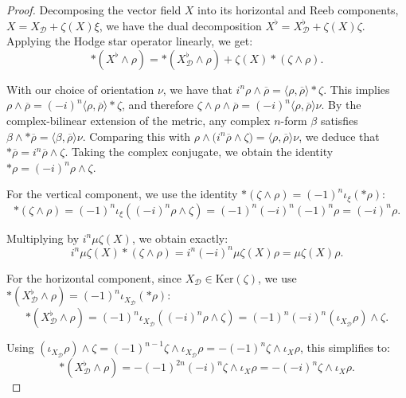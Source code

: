 \documentclass[10pt,a4paper,twoside,reqno]{amsart}
\theoremstyle{plain}
\theoremstyle{definition}
\theoremstyle{remark}
\newcommand{\escal}[1]{\langle#1\rangle}
\renewcommand{\ker}{\mathrm{Ker}}
\begin{document}
\begin{proof}
\noindent
Decomposing the vector field $X$ into its horizontal and Reeb components, $X = X_{\mathcal{D}} + \zeta(X)\xi$, we have the dual decomposition $X^{\flat} = X_{\mathcal{D}}^{\flat} + \zeta(X)\zeta$. Applying the Hodge star operator linearly, we get:
\begin{equation*}
*(X^{\flat} \wedge \rho) = *(X_{\mathcal{D}}^{\flat} \wedge \rho) + \zeta(X)*(\zeta \wedge \rho).
\end{equation*}

\noindent
With our choice of orientation $\nu$, we have that $i^n\rho\wedge\overline{\rho} = \escal{\rho,\overline{\rho}}*\zeta$. This implies $\rho \wedge \overline{\rho} = (-i)^n \escal{\rho,\overline{\rho}} *\zeta$, and therefore $\zeta \wedge \rho \wedge \overline{\rho} = (-i)^n \escal{\rho,\overline{\rho}} \nu$. By the complex-bilinear extension of the metric, any complex $n$-form $\beta$ satisfies $\beta \wedge *\overline{\rho} = \escal{\beta,\overline{\rho}}\nu$. Comparing this with $\rho \wedge \big(i^n\overline{\rho} \wedge \zeta\big) = \escal{\rho,\overline{\rho}} \nu$, we deduce that $*\overline{\rho} = i^n  \overline{\rho} \wedge \zeta$. Taking the complex conjugate, we obtain the identity $*\rho = (-i)^n \rho \wedge \zeta$.\medskip

\noindent
For the vertical component, we use the identity $*(\zeta \wedge \rho) = (-1)^n \iota_\xi(*\rho)$:
\begin{equation*}
*(\zeta \wedge \rho) = (-1)^n \iota_\xi((-i)^n \rho \wedge \zeta) = (-1)^n (-i)^n (-1)^n \rho = (-i)^n \rho.
\end{equation*}

\noindent
Multiplying by $i^n \mu \zeta(X)$, we obtain exactly:
\begin{equation*}
i^n \mu \zeta(X)*(\zeta\wedge\rho) = i^n(-i)^n\mu\zeta(X)\rho = \mu\zeta(X)\rho.
\end{equation*}

\noindent
For the horizontal component, since $X_{\mathcal{D}} \in \ker(\zeta)$, we use $*(X_{\mathcal{D}}^\flat \wedge \rho) = (-1)^n \iota_{X_{\mathcal{D}}}(*\rho)$:
\begin{equation*}
*(X_{\mathcal{D}}^{\flat} \wedge \rho) = (-1)^n \iota_{X_{\mathcal{D}}}((-i)^n \rho \wedge \zeta) = (-1)^n (-i)^n (\iota_{X_{\mathcal{D}}} \rho) \wedge \zeta.
\end{equation*}

\noindent
Using $(\iota_{X_{\mathcal{D}}} \rho) \wedge \zeta = (-1)^{n-1} \zeta \wedge \iota_{X_{\mathcal{D}}} \rho = -(-1)^n \zeta \wedge \iota_X \rho$, this simplifies to:
\begin{equation*}
*(X_{\mathcal{D}}^{\flat} \wedge \rho) = -(-1)^{2n}(-i)^n \zeta \wedge \iota_X \rho = -(-i)^n \zeta \wedge \iota_X \rho.
\end{equation*}


\end{proof}
\end{document}
